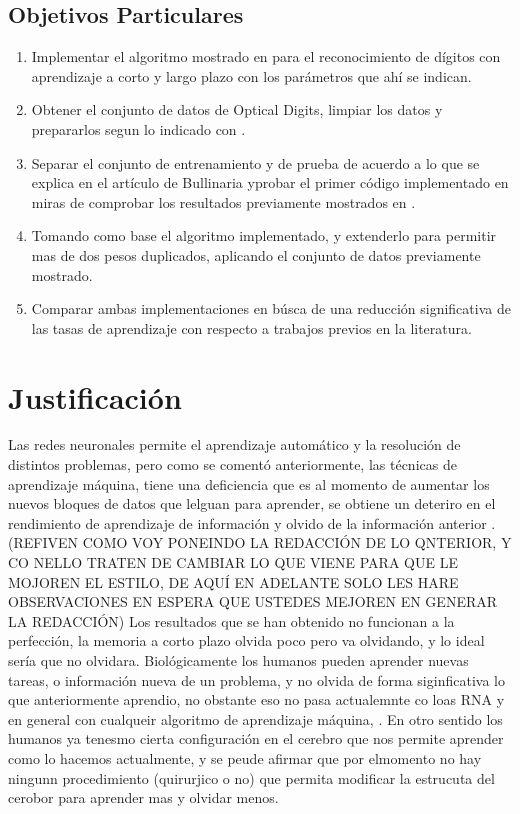     \subsection{Objetivos Particulares}
        \begin{enumerate}
            \item Implementar el algoritmo mostrado en \cite{bullinaria2009} para el reconocimiento de dígitos con aprendizaje a corto y largo plazo con los parámetros que ahí se indican.
            \item Obtener el conjunto de datos de Optical Digits, limpiar los datos y prepararlos segun lo indicado con \cite{bullinaria2009}.
            \item Separar el conjunto de entrenamiento y de prueba de acuerdo a lo que se explica en el artículo de Bullinaria yprobar el primer código implementado en miras de comprobar  los resultados previamente mostrados en \cite{bullinaria2009}.
            \item Tomando como base el algoritmo implementado,  y extenderlo para permitir mas de dos pesos duplicados, aplicando el conjunto de datos previamente mostrado.
            \item Comparar ambas implementaciones en búsca de una reducción significativa de las tasas de aprendizaje con respecto a trabajos previos en la literatura.
        \end{enumerate}
\section{Justificaci\'on}

        Las redes neuronales permite el aprendizaje automático y la resoluci\'on de distintos problemas,  pero como se comentó anteriormente,  las técnicas de aprendizaje máquina, tiene una deficiencia que es al momento de aumentar los nuevos bloques de datos que lelguan para aprender,  se obtiene un deteriro en el rendimiento de aprendizaje de información y olvido de la información anterior \cite{bullinaria2009}.   (REFIVEN COMO VOY PONEINDO LA REDACCIÓN DE LO QNTERIOR, Y CO NELLO TRATEN DE CAMBIAR LO QUE VIENE PARA QUE LE MOJOREN EL ESTILO, DE AQUÍ EN ADELANTE SOLO LES HARE OBSERVACIONES EN ESPERA QUE USTEDES MEJOREN EN GENERAR LA REDACCIÓN) Los 
        resultados que se han obtenido no funcionan a la perfección, la memoria a corto plazo olvida poco 
        pero va olvidando, y lo ideal sería que no olvidara. Biológicamente los humanos pueden aprender nuevas tareas, o información nueva de un problema, y no olvida de forma siginficativa lo que anteriormente aprendio, no obstante eso no pasa actualemnte co loas RNA y en general con cualqueir algoritmo de aprendizaje máquina, . En otro sentido los humanos ya tenesmo cierta configuración en el cerebro que nos permite aprender como lo hacemos actualmente,  y se peude afirmar que por elmomento no hay ningunn procedimiento (quirurjico o no) que permita modificar la estrucuta del cerobor para aprender mas y olvidar menos. 

